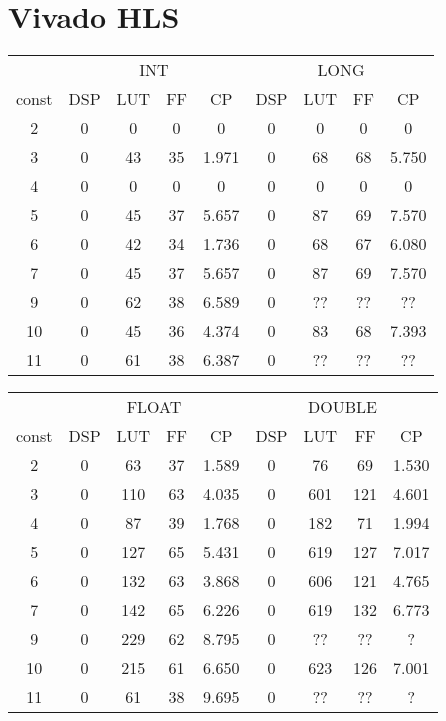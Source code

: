 \documentclass[10pt,a4paper,twoside]{article}
\begin{document}
\section{Vivado HLS}
\begin{tabular}{|c||c|c|c|c|c|c|c|c|}
    \hline
     & \multicolumn{4}{|c}{INT} & \multicolumn{4}{|c||}{LONG}\\
    const & DSP & LUT & FF & CP & DSP & LUT & FF & CP \\
    \hline
    2 & 0 & 0 & 0 & 0 & 0 & 0 & 0 & 0 \\
    \hline
    3 & 0 & 43 & 35 & 1.971 & 0 & 68 & 68 & 5.750 \\
    \hline
    4 & 0 & 0 & 0 & 0 & 0 & 0 & 0 & 0 \\
    \hline
    5 & 0 & 45 & 37 & 5.657 & 0 & 87 & 69 & 7.570 \\
    \hline
    6 & 0 & 42 & 34 & 1.736 & 0 & 68 & 67 & 6.080 \\
    \hline
    7 & 0 & 45 & 37 & 5.657 & 0 & 87 & 69 & 7.570 \\
    \hline
    9 & 0 & 62 & 38 & 6.589 & 0 & ?? & ?? & ?? \\
    \hline
    10 & 0 & 45 & 36 & 4.374 & 0 & 83 & 68 & 7.393 \\
    \hline
    11 & 0 & 61 & 38 & 6.387 & 0 & ?? & ?? & ?? \\
    \hline
\end{tabular}

\begin{tabular}{|c||c|c|c|c|c|c|c|c|}
    \hline
     & \multicolumn{4}{|c|}{FLOAT} &  \multicolumn{4}{|c|}{DOUBLE}\\
    const & DSP & LUT & FF & CP & DSP & LUT & FF & CP \\
    \hline
    2 & 0 & 63 & 37 & 1.589 & 0 & 76 & 69 & 1.530 \\
    \hline
    3 & 0 & 110 & 63 & 4.035 & 0 & 601 & 121 & 4.601 \\
    \hline
    4 & 0 & 87 & 39 & 1.768 & 0 & 182 & 71 & 1.994 \\
    \hline
    5 & 0 & 127 & 65 & 5.431 & 0 & 619 & 127 & 7.017 \\
    \hline
    6 & 0 & 132 & 63 & 3.868 & 0 & 606 & 121 & 4.765 \\
    \hline
    7 & 0 & 142 & 65 & 6.226 & 0 & 619 & 132 & 6.773 \\
    \hline
    9 & 0 & 229 & 62 & 8.795 & 0 &  ?? & ?? & ? \\
    \hline
    10 & 0 & 215 & 61 & 6.650 & 0 & 623 & 126 & 7.001 \\
    \hline
    11 & 0 & 61 & 38 & 9.695 & 0 & ?? & ?? & ? \\
    \hline
\end{tabular}
\end{document}
